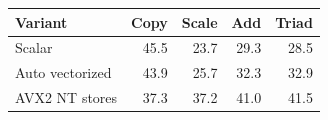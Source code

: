 \begin{tabular}{lrrrr}
\hline
Variant & Copy & Scale & Add & Triad \\
\hline
Scalar & 45.5 & 23.7 & 29.3 & 28.5 \\
Auto vectorized & 43.9 & 25.7 & 32.3 & 32.9 \\
AVX2 NT stores & 37.3 & 37.2 & 41.0 & 41.5 \\
\hline
\end{tabular}
